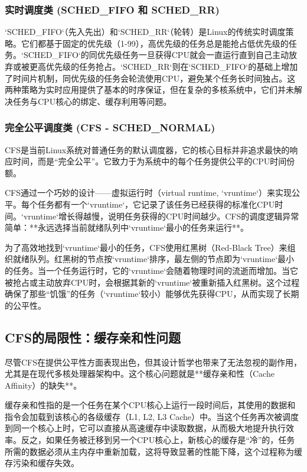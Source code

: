\subsubsection{实时调度类 (SCHED\_FIFO 和 SCHED\_RR)}
`SCHED\_FIFO`（先入先出）和`SCHED\_RR`（轮转）是Linux的传统实时调度策略。它们都基于固定的优先级（1-99），高优先级的任务总是能抢占低优先级的任务。`SCHED\_FIFO`的同优先级任务一旦获得CPU就会一直运行直到自己主动放弃或被更高优先级的任务抢占。`SCHED\_RR`则在`SCHED\_FIFO`的基础上增加了时间片机制，同优先级的任务会轮流使用CPU，避免某个任务长时间独占。这两种策略为实时应用提供了基本的时序保证，但在复杂的多核系统中，它们并未解决任务与CPU核心的绑定、缓存利用等问题。

\subsubsection{完全公平调度类 (CFS - SCHED\_NORMAL)}
CFS是当前Linux系统对普通任务的默认调度器，它的核心目标并非追求最快的响应时间，而是“完全公平”。它致力于为系统中的每个任务提供公平的CPU时间份额。

CFS通过一个巧妙的设计——虚拟运行时（virtual runtime, `vruntime`）来实现公平。每个任务都有一个`vruntime`，它记录了该任务已经获得的标准化CPU时间。`vruntime`增长得越慢，说明任务获得的CPU时间越少。CFS的调度逻辑异常简单：**永远选择当前就绪队列中`vruntime`最小的任务来运行**。

为了高效地找到`vruntime`最小的任务，CFS使用红黑树（Red-Black Tree）来组织就绪队列。红黑树的节点按`vruntime`排序，最左侧的节点即为`vruntime`最小的任务。当一个任务运行时，它的`vruntime`会随着物理时间的流逝而增加。当它被抢占或主动放弃CPU时，会根据其新的`vruntime`被重新插入红黑树。这个过程确保了那些“饥饿”的任务（`vruntime`较小）能够优先获得CPU，从而实现了长期的公平性。

\subsection{CFS的局限性：缓存亲和性问题}

尽管CFS在提供公平性方面表现出色，但其设计哲学也带来了无法忽视的副作用，尤其是在现代多核处理器架构中。这个核心问题就是**缓存亲和性（Cache Affinity）的缺失**。

缓存亲和性指的是一个任务在某个CPU核心上运行一段时间后，其使用的数据和指令会加载到该核心的各级缓存（L1, L2, L3 Cache）中。当这个任务再次被调度到同一个核心上时，它可以直接从高速缓存中读取数据，从而极大地提升执行效率。反之，如果任务被迁移到另一个CPU核心上，新核心的缓存是“冷”的，任务所需的数据必须从主内存中重新加载，这将导致显著的性能下降，这个过程称为缓存污染和缓存失效。

